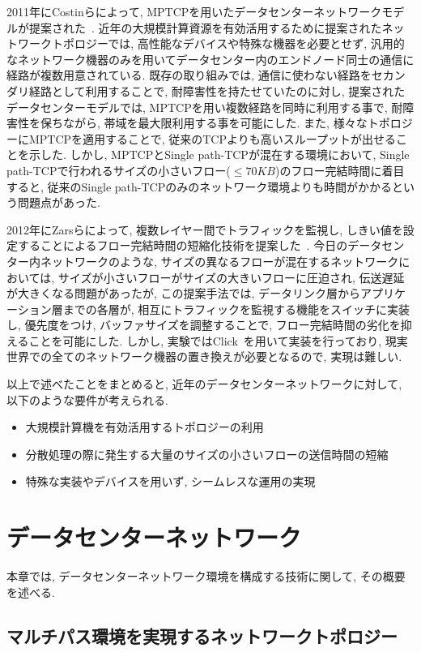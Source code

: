 \documentclass[11pt, a4paper, twocolumn]{jsarticle}
\begin{document}
2011年にCostinらによって, MPTCPを用いたデータセンターネットワークモデルが提案された~\cite{improving}.
近年の大規模計算資源を有効活用するために提案されたネットワークトポロジーでは,
高性能なデバイスや特殊な機器を必要とせず, 汎用的なネットワーク機器のみを用いてデータセンター内のエンドノード同士の通信に経路が複数用意されている.
既存の取り組みでは, 通信に使わない経路をセカンダリ経路として利用することで, 耐障害性を持たせていたのに対し, 提案されたデータセンターモデルでは,
MPTCPを用い複数経路を同時に利用する事で, 耐障害性を保ちながら, 帯域を最大限利用する事を可能にした.
また, 様々なトポロジーにMPTCPを適用することで, 従来のTCPよりも高いスループットが出せることを示した.
しかし, MPTCPとSingle path-TCPが混在する環境において, Single
path-TCPで行われるサイズの小さいフロー($\leq70KB$)のフロー完結時間に着目すると, 従来のSingle
path-TCPのみのネットワーク環境よりも時間がかかるという問題点があった.

2012年にZarsらによって, 複数レイヤー間でトラフィックを監視し,
しきい値を設定することによるフロー完結時間の短縮化技術を提案した~\cite{detail}.
今日のデータセンター内ネットワークのような, サイズの異なるフローが混在するネットワークにおいては, サイズが小さいフローがサイズの大きいフローに圧迫され,
伝送遅延が大きくなる問題があったが, この提案手法では, データリンク層からアプリケーション層までの各層が,
相互にトラフィックを監視する機能をスイッチに実装し, 優先度をつけ, バッファサイズを調整することで, フロー完結時間の劣化を抑えることを可能にした.
しかし, 実験ではClick~\cite{click}を用いて実装を行っており, 現実世界での全てのネットワーク機器の置き換えが必要となるので, 実現は難しい.

以上で述べたことをまとめると, 近年のデータセンターネットワークに対して, 以下のような要件が考えられる.
\begin{itemize}
  \item 大規模計算機を有効活用するトポロジーの利用
  \item 分散処理の際に発生する大量のサイズの小さいフローの送信時間の短縮
  \item 特殊な実装やデバイスを用いず, シームレスな運用の実現
\end{itemize}

\section{データセンターネットワーク}
\label{sec:datacenter}
本章では, データセンターネットワーク環境を構成する技術に関して, その概要を述べる.
\subsection{マルチパス環境を実現するネットワークトポロジー}
\label{sec:topology}
\end{document}
